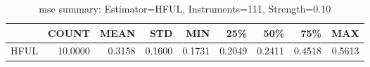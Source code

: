 \begin{table}[ht]
\centering
\caption{mse summary: Estimator=HFUL, Instruments=111, Strength=0.10}
\begin{tabular}{lrrrrrrrr}
\toprule
 & COUNT & MEAN & STD & MIN & 25\% & 50\% & 75\% & MAX \\
\midrule
HFUL & 10.0000 & 0.3158 & 0.1600 & 0.1731 & 0.2049 & 0.2411 & 0.4518 & 0.5613 \\
\bottomrule
\end{tabular}
\end{table}

